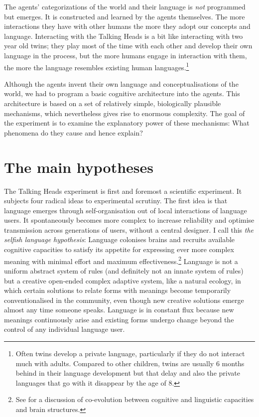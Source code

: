 The agents' categorizations of
the world and their language is {\itshape not} programmed but
emerges. It is 
constructed and learned by the agents themselves. The more 
interactions they have with other humans the more they 
adopt our concepts and language. Interacting with the Talking 
Heads is a bit like interacting with two year old 
twins; they play  most of the time with each other and
develop their own language in the process, but the more
humans engage in interaction with them, the more the language
resembles existing human languages.\footnote{Often twins develop a private language, particularly 
if they do not interact much with adults. Compared
to other children, twins are usually 6 months behind 
in their language development but that delay and 
also the private languages that go with it disappear
by the age of 8.}

Although the agents invent their own 
language and conceptualisations of the world, we
had to program a basic cognitive architecture into 
the agents. This architecture is based on a set of relatively
simple, biologically plausible mechanisms, which 
nevertheless gives rise to enormous complexity.
The goal of the experiment is to examine the explanatory power of 
these mechanisms: What phenomena do they cause and
hence explain? 

\section{The main hypotheses}

The Talking Heads experiment is first and foremost
a scientific experiment. It subjects four radical ideas 
to experimental scrutiny. 
The first idea is that 
language emerges through self-organisation out of local
interactions of language users. It spontaneously 
becomes more complex to increase
reliability and optimise transmission across generations of 
users, without a central designer.
I call this {\itshape the selfish
language hypothesis}: Language colonises
brains and recruits available cognitive capacities to satisfy
its appetite for expressing ever more complex meaning with
minimal effort and maximum 
effectiveness.\footnote{
See \cite{Deacon:1998} for a discussion of 
co-evolution between cognitive and linguistic
capacities and brain structures.}
Language is 
not a uniform abstract system of rules (and definitely not an 
innate system of rules) but a creative open-ended complex
adaptive system, like a natural
ecology, in which certain solutions to relate forms with 
meanings become temporarily conventionalised in 
the community, even though new creative solutions
emerge almost any time someone speaks. Language
is in constant flux because new meanings continuously
arise and existing forms undergo change beyond the 
control of any individual language user. 

